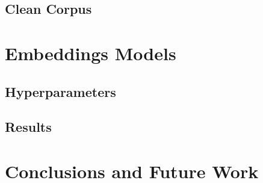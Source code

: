 \documentclass{article}
\begin{document}
\subsection{Clean Corpus}

\section{Embeddings Models}

\subsection{Hyperparameters}

\subsection{Results}

\section{Conclusions and Future Work}






\end{document}
